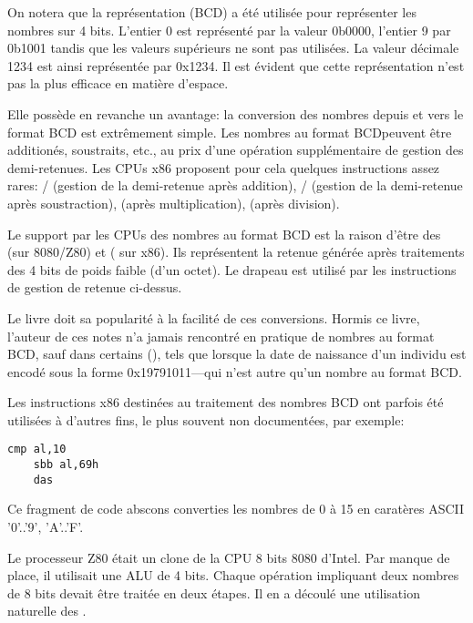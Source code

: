 On notera que la représentation  (\ac{BCD}) a été utilisée pour représenter les nombres sur 4 bits.
L'entier 0 est représenté par la valeur 0b0000, l'entier 9 par 0b1001 tandis que les valeurs supérieurs ne sont pas utilisées.
La valeur décimale 1234 est ainsi représentée par 0x1234.
Il est évident que cette représentation n'est pas la plus efficace en matière d'espace.

Elle possède en revanche un avantage: la conversion des nombres depuis et vers le format \ac{BCD} est extrêmement simple.
Les nombres au format BCDpeuvent être additionés, soustraits, etc., au prix d'une opération supplémentaire de gestion des demi-retenues.
Les CPUs x86 proposent pour cela quelques instructions assez rares:
/ (gestion de la demi-retenue après addition),
/ (gestion de la demi-retenue après soustraction),
 (après multiplication),
 (après division).

Le support par les CPUs des nombres au format \ac{BCD} est la raison d'être des  (sur 8080/Z80) et
 ( sur x86).
Ils représentent la retenue générée après traitements des 4 bits de poids faible (d'un octet).
Le drapeau est utilisé par les instructions de gestion de retenue ci-dessus.

Le livre  doit sa popularité à la facilité de ces conversions.
Hormis ce livre, l'auteur de ces notes n'a jamais rencontré en pratique de nombres au format \ac{BCD}, sauf dans certains 
 (),
tels que lorsque la date de naissance d'un individu est encodé sous la forme 0x19791011---qui n'est autre qu'un nombre au format \ac{BCD}.

Les instructions x86 destinées au traitement des nombres \ac{BCD} ont parfois été utilisées à d'autres fins, le plus souvent non documentées, par exemple:

\begin{lstlisting}[style=customasmx86]
	cmp al,10
	sbb al,69h
	das
\end{lstlisting}

Ce fragment de code abscons converties les nombres de 0 à 15 en caratères \ac{ASCII} '0'..'9', 'A'..'F'.


Le processeur Z80 était un clone de la CPU 8 bits 8080 d'Intel. Par manque de place, il utilisait une \ac{ALU} de 4 bits.
Chaque opération impliquant deux nombres de 8 bits devait être traitée en deux étapes.
Il en a découlé une utilisation naturelle des .

